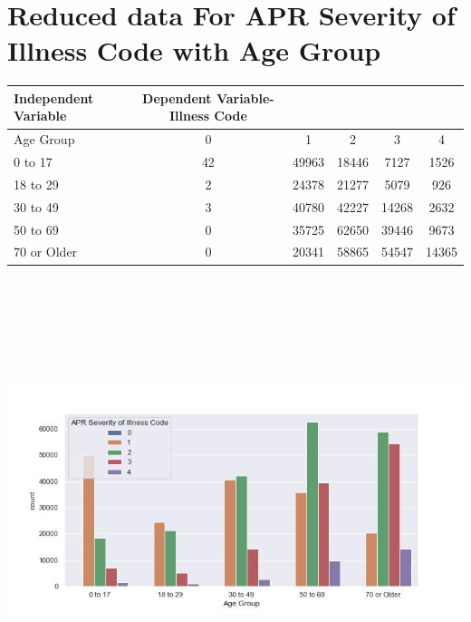 \documentclass[
	letterpaper, %
]{jdf}
\begin{document}
\section{Reduced data For APR Severity of Illness Code with Age Group}
\begin{jdftable}
\label{table:Example}
\small %
\begin{tabular}{@{} l c c c c c}
\textbf{Independent Variable} & \textbf{Dependent Variable-Illness Code} & & & & \\
	\toprule[0.5pt]
	Age Group & 0 & 1 & 2 & 3 & 4\\

0 to 17     &  42 &  49963 &  18446 &   7127 &   1526 \\	\midrule
18 to 29    &   2 &  24378 &  21277 &   5079 &    926 \\	\midrule
30 to 49    &   3 &  40780 &  42227 &  14268 &   2632 \\	\midrule
50 to 69    &   0 &  35725 &  62650 &  39446 &   9673 \\	\midrule
70 or Older &   0 &  20341 &  58865 &  54547 &  14365 \\
\end{tabular}
\end{jdftable}

\begin{jdffigure}
\includegraphics[height=13cm]{Figures/code-age_reduced.jpg} \\
\label{fig:code-age}%
\end{jdffigure}
\end{document}

